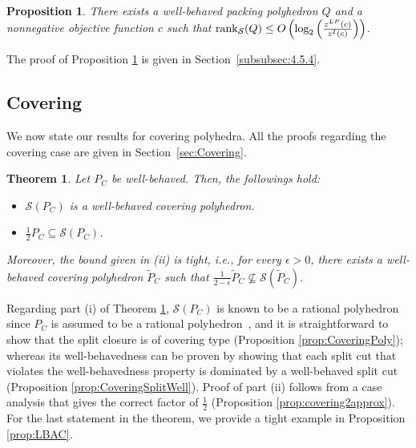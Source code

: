 \documentclass[11pt]{article}
\newcommand{\seq}{\subseteq}
\DeclareMathOperator{\rank}{rank}
\renewcommand{\S}{\mathcal{S}}
\newtheorem{theorem}{Theorem}
\newtheorem{proposition}{Proposition}
\newcommand{\cred}{\color{black}}
\newcommand{\zLPc}{z^{LP}(c)}
\newcommand{\zIc}{z^{I}(c)}
\begin{document}
\begin{proposition}
\label{prop:prop1}
There exists a well-behaved packing polyhedron $Q$ and a nonnegative objective function $c$ such that $\rank_{\S}(Q) \le O\left(\textup{log}_2\left( \frac{\zLPc}{\zIc}\right)\right)$.
\end{proposition}

The proof of Proposition \ref{prop:prop1} is given in Section~\ref{subsubsec:4.5.4}.

\subsection{Covering}

We now state our results for covering {\cred polyhedra}. All the proofs regarding the covering case are given in Section~\ref{sec:Covering}.

\begin{theorem}
\label{thm:mainAppCovering}
Let $P_C$ be well-behaved. Then, the followings hold:
\begin{itemize}
\item[(i)] $\S(P_C)$ is a well-behaved covering polyhedron. 
\item[(ii)] $\frac{1}{2} P_C   \seq \S(P_C) $. 
\end{itemize} 
Moreover, the bound given in (ii) is tight, i.e., for every $\epsilon >0$, there exists a well-behaved covering polyhedron $\tilde{P}_C$ such that $\frac{1}{2-\epsilon} \tilde{P}_C  \not \seq \S(\tilde{P}_C)$.
\end{theorem}

Regarding part (i) of Theorem \ref{thm:mainAppCovering}, $\S(P_C)$ is known to be a rational polyhedron since $P_C$ is assumed to be a rational polyhedron~{\cred \cite{cook:ka:sc:1990}}, and it is straightforward to show that the split closure is of covering type (Proposition \ref{prop:CoveringPoly}); whereas its well-behavedness can be proven by showing that each split cut that violates the well-behavedness property is dominated by a well-behaved split cut (Proposition \ref{prop:CoveringSplitWell}). Proof of part (ii) follows from a case analysis that gives the correct factor of {\cred $\frac{1}{2}$} (Proposition \ref{prop:covering2approx}). For the last statement in the theorem, we provide a tight example in Proposition \ref{prop:LBAC}.
\end{document}
